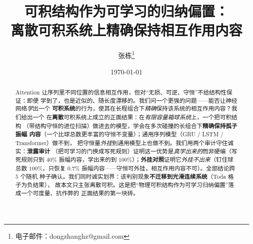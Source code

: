 \documentclass[11pt]{article}
\title{可积结构作为可学习的归纳偏置：\\
       离散可积系统上精确保持相互作用内容}
\author{张栋\thanks{电子邮件：dongzhanghz@gmail.com}}
\date{\today}
\begin{document}
\maketitle

\newcommand{\amp}{\mathrm{amp}}


\begin{abstract}
\noindent
Attention 让序列里不同位置的信息相互作用，但对“无损、可逆、守恒”不给结构性保证：即便
学到了，也是近似的、随长度漂移的。我们问一个更强的问题——能否让神经网络\emph{学}出一个
\textbf{可积系统}的行为，使其在长程组合下\emph{精确}保持该系统的相互作用内容？我们给出一个
在\textbf{离散}可积系统上成立的正面结果：在\emph{有限容量箱球系统}上，一个把可积结构
（带结构守恒的进位扫描）做进去的模型，学会在多次碰撞的长组合下\textbf{精确保持孤子振幅
内容}（一个比球总数更丰富的守恒不变量）；通用序列模型（GRU / LSTM / Transformer）做不到，
把守恒量\emph{外挂}到通用模型上也做不到。我们用两个审计守住诚实：\textbf{泄露审计}
（把可学习的门换成写死规则）证明这一优势是\emph{真学出来的}而非硬编（写死规则只到 $40\%$
振幅内容，学出来的到 $100\%$）；\textbf{外挂对照}证明它\emph{外挂不出来}（钉住球总数
$100\%$，只恢复 $0.7\%$ 振幅内容——守恒可外挂，相互作用内容不可）。全部结论跨 $5$ 个随机
种子确认。我们同时诚实划界：该判别现象\textbf{不迁移到光滑连续系统}（Toda 格子为负结果），
故本文只主张离散可积。这是把“物理可积结构作为可学习归纳偏置”落成一个可度量、抗作弊的
正面结果的第一块砖。
\end{abstract}
\end{document}
